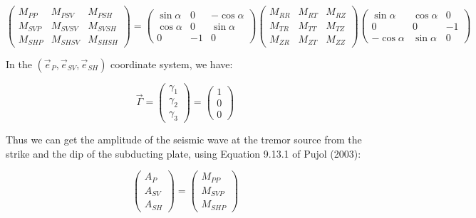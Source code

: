 \documentclass[methods.tex]{subfiles}
\begin{document}
\begin{equation}
\begin{pmatrix}
M_{PP} & M_{PSV} & M_{PSH} \\
M_{SVP} & M_{SVSV} & M_{SVSH} \\
M_{SHP} & M_{SHSV} & M_{SHSH}
\end{pmatrix} = \begin{pmatrix}
\sin \alpha & 0 & - \cos \alpha \\
\cos \alpha & 0 & \sin \alpha \\
0 & - 1 & 0
\end{pmatrix} \begin{pmatrix}
M_{RR} & M_{RT} & M_{RZ} \\
M_{TR} & M_{TT} & M_{TZ} \\
M_{ZR} & M_{ZT} & M_{ZZ}
\end{pmatrix} \begin{pmatrix}
\sin \alpha & \cos \alpha & 0 \\
0 & 0 & - 1 \\
- \cos \alpha & \sin \alpha & 0
\end{pmatrix}
\end{equation}

In the $\left( \vec{e}_P, \vec{e}_{SV}, \vec{e}_{SH} \right)$ coordinate system, we have:

\begin{equation}
\vec{\Gamma} = \begin{pmatrix}
\gamma_1 \\
\gamma_2 \\
\gamma_3
\end{pmatrix} = \begin{pmatrix}
1 \\
0 \\
0
\end{pmatrix}
\end{equation}

Thus we can get the amplitude of the seismic wave at the tremor source from the strike and the dip of the subducting plate, using Equation 9.13.1 of Pujol (2003):

\begin{equation}
\begin{pmatrix}
A_P \\
A_{SV} \\
A_{SH}
\end{pmatrix} =\begin{pmatrix}
M_{PP} \\
M_{SVP} \\
M_{SHP}
\end{pmatrix}
\end{equation}
\end{document}
